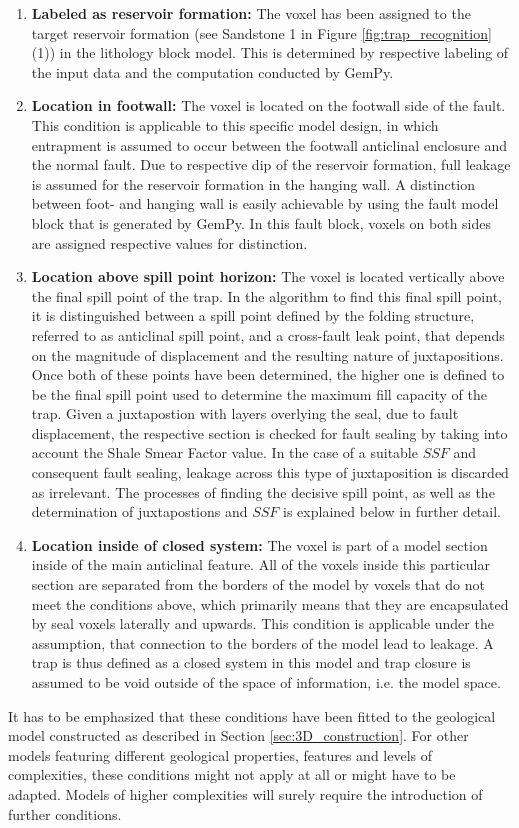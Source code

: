 		\begin{enumerate}
			\item \textbf{Labeled as reservoir formation:} The voxel has been assigned to the target reservoir formation (see Sandstone 1 in Figure \ref{fig:trap_recognition} (1)) in the lithology block model. This is determined by respective labeling of the input data and the computation conducted by GemPy.
			\item \textbf{Location in footwall:} The voxel is located on the footwall side of the fault. This condition is applicable to this specific model design, in which entrapment is assumed to occur between the footwall anticlinal enclosure and the normal fault. Due to respective dip of the reservoir formation, full leakage is assumed for the reservoir formation in the hanging wall. A distinction between foot- and hanging wall is easily achievable by using the fault model block that is generated by GemPy. In this fault block, voxels on both sides are assigned respective values for distinction.
			\item \textbf{Location above spill point horizon:} The voxel is located vertically above the final spill point of the trap. In the algorithm to find this final spill point, it is distinguished between a spill point defined by the folding structure, referred to as anticlinal spill point, and a cross-fault leak point, that depends on the magnitude of displacement and the resulting nature of juxtapositions. Once both of these points have been determined, the higher one is defined to be the final spill point used to determine the maximum fill capacity of the trap.  Given a juxtapostion with layers overlying the seal, due to fault displacement, the respective section is checked for fault sealing by taking into account the Shale Smear Factor value. In the case of a suitable $SSF$ and consequent fault sealing, leakage across this type of juxtaposition is discarded as irrelevant. The processes of finding the decisive spill point, as well as the determination of juxtapostions and $SSF$ is explained below in further detail.
			\item \textbf{Location inside of closed system:} The voxel is part of a model section inside of the main anticlinal feature. All of the voxels inside this particular section are separated from the borders of the model by voxels that do not meet the conditions above, which primarily means that they are encapsulated by seal voxels laterally and upwards. This condition is applicable  under the assumption, that connection to the borders of the model lead to leakage. A trap is thus defined as a closed system in this model and trap closure is assumed to be void outside of the space of information, i.e. the model space.	
		\end{enumerate}
		It has to be emphasized that these conditions have been fitted to the geological model constructed as described in Section \ref{sec:3D_construction}. For other models featuring different geological properties, features and levels of complexities, these conditions might not apply at all or might have to be adapted. Models of higher complexities will surely require the introduction of further conditions.
		
